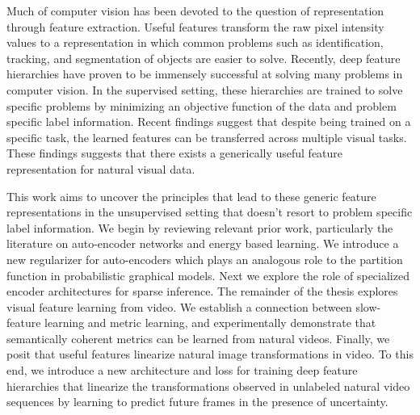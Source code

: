 Much of computer vision has been devoted to the question of representation
through feature extraction. Useful features transform the raw pixel intensity
values to a representation in which common problems such as identification,
tracking, and segmentation of objects are easier to solve. Recently, deep
feature hierarchies have proven to be immensely successful at solving many
problems in computer vision. In the supervised setting, these hierarchies are
trained to solve specific problems by minimizing an objective function of the
data and problem specific label information. Recent findings suggest that
despite being trained on a specific task, the learned features can be
transferred across multiple visual tasks. These findings suggests that there
exists a generically useful feature representation for natural visual data.    

This work aims to uncover the principles that lead to these generic feature
representations in the unsupervised setting that doesn't resort to problem
specific label information. We begin by reviewing relevant prior work,
particularly the literature on auto-encoder networks and energy based learning.
We introduce a new regularizer for auto-encoders which plays an analogous role
to the partition function in probabilistic graphical models.  Next we explore
the role of specialized encoder architectures for sparse inference. The
remainder of the thesis explores visual feature learning from video. We
establish a connection between slow-feature learning and metric learning, and
experimentally demonstrate that semantically coherent metrics can be learned
from natural videos. Finally, we posit that useful features linearize
natural image transformations in video. To this end, we introduce a new
architecture and loss for training deep feature hierarchies that linearize the
transformations observed in unlabeled natural video sequences by learning to
predict future frames in the presence of uncertainty.           


 
